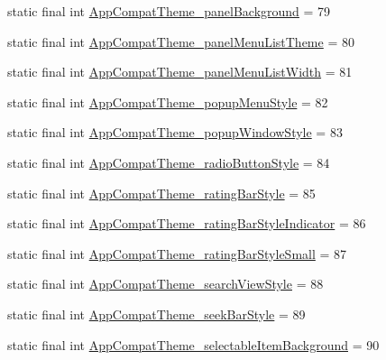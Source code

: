 \begin{DoxyCompactItemize}
static final int \mbox{\hyperlink{classandroid_1_1support_1_1v7_1_1appcompat_1_1_r_1_1styleable_a5ad68b26ca37d9c63dd5f687d2663c47}{App\+Compat\+Theme\+\_\+panel\+Background}} = 79
\item 
static final int \mbox{\hyperlink{classandroid_1_1support_1_1v7_1_1appcompat_1_1_r_1_1styleable_a889b79e456e07e7442abe6d695c4bc4e}{App\+Compat\+Theme\+\_\+panel\+Menu\+List\+Theme}} = 80
\item 
static final int \mbox{\hyperlink{classandroid_1_1support_1_1v7_1_1appcompat_1_1_r_1_1styleable_acce98a5594dacb0b3e2e8b2996f57115}{App\+Compat\+Theme\+\_\+panel\+Menu\+List\+Width}} = 81
\item 
static final int \mbox{\hyperlink{classandroid_1_1support_1_1v7_1_1appcompat_1_1_r_1_1styleable_a634a0a1274878447854f76fbc6d73ff6}{App\+Compat\+Theme\+\_\+popup\+Menu\+Style}} = 82
\item 
static final int \mbox{\hyperlink{classandroid_1_1support_1_1v7_1_1appcompat_1_1_r_1_1styleable_a7d67d8207d0b95f7bafa0bee88901c2b}{App\+Compat\+Theme\+\_\+popup\+Window\+Style}} = 83
\item 
static final int \mbox{\hyperlink{classandroid_1_1support_1_1v7_1_1appcompat_1_1_r_1_1styleable_a507b0da84c2a4c3cc7f348ce92b93afa}{App\+Compat\+Theme\+\_\+radio\+Button\+Style}} = 84
\item 
static final int \mbox{\hyperlink{classandroid_1_1support_1_1v7_1_1appcompat_1_1_r_1_1styleable_af2fdf6d4685eaf6d4e89e2158bdb3e3b}{App\+Compat\+Theme\+\_\+rating\+Bar\+Style}} = 85
\item 
static final int \mbox{\hyperlink{classandroid_1_1support_1_1v7_1_1appcompat_1_1_r_1_1styleable_a1f2336445a8f0e6b541206745dfd6e70}{App\+Compat\+Theme\+\_\+rating\+Bar\+Style\+Indicator}} = 86
\item 
static final int \mbox{\hyperlink{classandroid_1_1support_1_1v7_1_1appcompat_1_1_r_1_1styleable_a276cc020d5ff419b84b2ff5d85ab6b92}{App\+Compat\+Theme\+\_\+rating\+Bar\+Style\+Small}} = 87
\item 
static final int \mbox{\hyperlink{classandroid_1_1support_1_1v7_1_1appcompat_1_1_r_1_1styleable_a4f714859a4d201db6fc8c8bf78cc4669}{App\+Compat\+Theme\+\_\+search\+View\+Style}} = 88
\item 
static final int \mbox{\hyperlink{classandroid_1_1support_1_1v7_1_1appcompat_1_1_r_1_1styleable_a16545da0fa5e65d1e4f16e861ae18103}{App\+Compat\+Theme\+\_\+seek\+Bar\+Style}} = 89
\item 
static final int \mbox{\hyperlink{classandroid_1_1support_1_1v7_1_1appcompat_1_1_r_1_1styleable_acabe4330c965c183ae0187d8a0e1e6ca}{App\+Compat\+Theme\+\_\+selectable\+Item\+Background}} = 90

\end{DoxyCompactItemize}
